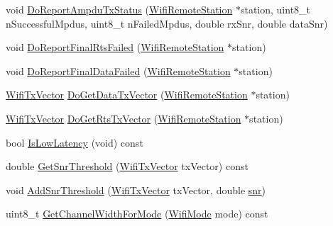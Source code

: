 \begin{DoxyCompactItemize}
\item 
void \hyperlink{classns3_1_1IdealWifiManager_aa3784a2bcc47408f2471aa629db566ff}{Do\+Report\+Ampdu\+Tx\+Status} (\hyperlink{structns3_1_1WifiRemoteStation}{Wifi\+Remote\+Station} $\ast$station, uint8\+\_\+t n\+Successful\+Mpdus, uint8\+\_\+t n\+Failed\+Mpdus, double rx\+Snr, double data\+Snr)
\item 
void \hyperlink{classns3_1_1IdealWifiManager_a982b93142de6352a7d1dfbe524720f4a}{Do\+Report\+Final\+Rts\+Failed} (\hyperlink{structns3_1_1WifiRemoteStation}{Wifi\+Remote\+Station} $\ast$station)
\item 
void \hyperlink{classns3_1_1IdealWifiManager_a6192666e6f32a33d59d832f6af4ca00b}{Do\+Report\+Final\+Data\+Failed} (\hyperlink{structns3_1_1WifiRemoteStation}{Wifi\+Remote\+Station} $\ast$station)
\item 
\hyperlink{classns3_1_1WifiTxVector}{Wifi\+Tx\+Vector} \hyperlink{classns3_1_1IdealWifiManager_a2e7570eb1f5cbef1067cfb714e94218e}{Do\+Get\+Data\+Tx\+Vector} (\hyperlink{structns3_1_1WifiRemoteStation}{Wifi\+Remote\+Station} $\ast$station)
\item 
\hyperlink{classns3_1_1WifiTxVector}{Wifi\+Tx\+Vector} \hyperlink{classns3_1_1IdealWifiManager_ab263f9a1c04747b2c2b55774bf97854a}{Do\+Get\+Rts\+Tx\+Vector} (\hyperlink{structns3_1_1WifiRemoteStation}{Wifi\+Remote\+Station} $\ast$station)
\item 
bool \hyperlink{classns3_1_1IdealWifiManager_a9eda2f184115bb0c1cf9493cfc2bdb95}{Is\+Low\+Latency} (void) const 
\item 
double \hyperlink{classns3_1_1IdealWifiManager_a4712a1357ab7ba3f2aba5b183cd18f6a}{Get\+Snr\+Threshold} (\hyperlink{classns3_1_1WifiTxVector}{Wifi\+Tx\+Vector} tx\+Vector) const 
\item 
void \hyperlink{classns3_1_1IdealWifiManager_a07b8198f3c1f258c46af76a3ffe746a7}{Add\+Snr\+Threshold} (\hyperlink{classns3_1_1WifiTxVector}{Wifi\+Tx\+Vector} tx\+Vector, double \hyperlink{lte__pathloss_8m_ae6e82a215dff6b79fb6e9952a1b78453}{snr})
\item 
uint8\+\_\+t \hyperlink{classns3_1_1IdealWifiManager_a02a51cef1d20b348546c8dc21537e565}{Get\+Channel\+Width\+For\+Mode} (\hyperlink{classns3_1_1WifiMode}{Wifi\+Mode} mode) const 
\end{DoxyCompactItemize}
